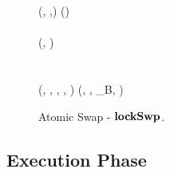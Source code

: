\begin{landscape}
\begin{figure}
\begin{center}
{{        (\varMwFundTx, \funStar{\varSpendableCoinAlice},\funStar{\varPtSpendableCoinAlice}) \< \< \< \< (\funStar{\varPtSpendableCoinBob}) \pcskipln \\
        \opFunResult \procDSharedOutputMwTxL{\funArray{\varSpendableCoin}}{\varAmountMW}{\cnstFalsum} \< \< \< \< \opFunResult \procDSharedOutputMwTxR{\varAmountMW} \\
        (\varMwRefundTx, \funStarAlt{\varSpendableCoinAlice}) \< \< \< \< \varMwRefundTx \pcskipln \\
        \opFunResult \procDSharedInpMwTxL{\funStar{\varPtSpendableCoinAlice}}{\varAmountMW}{\varTimeMW} \< \< \< \< \opFunResult \procDSharedInpMwTxR{\funStar{\varPtSpendableCoinBob}}{\varAmountMW} \\
        \procPublishMW{\funArray{\varMwFundTx,\varMwRefundTx}}  \\
        \pcreturn (\varSwpState, \funStar{\varPtSpendableCoinAlice}, \funStar{\varSpendableCoinAlice}, \varSecKeyAlice, \funStarAlt{\varSpendableCoinAlice}) \< \< \< \< \pcreturn (\varSwpState, \funStar{\varPtSpendableCoinBob}, \varUTXO_{B}, \varWit)
        }
        }
        \end{center}
        \caption{Atomic Swap - $\mathbf{lockSwp}$.}\label{fig:setup-swap}
    \end{figure}
\end{landscape}
\restoregeometry

\subsection{Execution Phase}\label{subsec:atom:exec}


